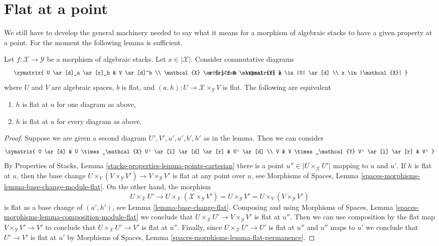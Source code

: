 \section{Flat at a point}
\label{section-flat-at-point}

\noindent
We still have to develop the general machinery needed to say what
it means for a morphism of algebraic stacks to have a given property
at a point. For the moment the following lemma is sufficient.

\begin{lemma}
\label{lemma-flat-at-point}
Let $f : \mathcal{X} \to \mathcal{Y}$ be a morphism of algebraic stacks.
Let $x \in |\mathcal{X}|$. Consider commutative diagrams
$$
\vcenter{
\xymatrix{
U \ar[d]_a \ar[r]_h & V \ar[d]^b \\
\mathcal{X} \ar[r]^f & \mathcal{Y}
}
}
\quad\text{with points}
\vcenter{
\xymatrix{
u \in |U| \ar[d] \\
x \in |\mathcal{X}|
}
}
$$
where $U$ and $V$ are algebraic spaces, $b$ is flat, and
$(a, h) : U \to \mathcal{X} \times_\mathcal{Y} V$
is flat. The following are equivalent
\begin{enumerate}
\item $h$ is flat at $u$ for one diagram as above,
\item $h$ is flat at $u$ for every diagram as above.
\end{enumerate}
\end{lemma}

\begin{proof}
Suppose we are given a second diagram $U', V', u', a', b', h'$ as
in the lemma. Then we can consider
$$
\xymatrix{
U \ar[d] & U \times_\mathcal{X} U' \ar[l] \ar[d] \ar[r] & U' \ar[d] \\
V & V \times_\mathcal{Y} V' \ar[l] \ar[r] & V'
}
$$
By Properties of Stacks, Lemma \ref{stacks-properties-lemma-points-cartesian}
there is a point $u'' \in |U \times_\mathcal{X} U'|$ mapping
to $u$ and $u'$. If $h$ is flat at $u$, then the base change
$U \times_V (V \times_\mathcal{Y} V') \to V \times_\mathcal{Y} V'$
is flat at any point over $u$, see
Morphisms of Spaces, Lemma \ref{spaces-morphisms-lemma-base-change-module-flat}.
On the other hand, the morphism
$$
U \times_\mathcal{X} U' \to
U \times_\mathcal{X} (\mathcal{X} \times_\mathcal{Y} V') =
U \times_\mathcal{Y} V' =
U \times_V (V \times_\mathcal{Y} V')
$$
is flat as a base change of $(a', h')$, see Lemma \ref{lemma-base-change-flat}.
Composing and using
Morphisms of Spaces, Lemma \ref{spaces-morphisms-lemma-composition-module-flat}
we conclude that $U \times_\mathcal{X} U' \to V \times_\mathcal{Y} V'$
is flat at $u''$. Then we can use composition by the flat map
$V \times_\mathcal{Y} V' \to V'$ to conclude that
$U \times_\mathcal{X} U' \to V'$ is flat at $u''$.
Finally, since $U \times_\mathcal{X} U' \to U'$ is flat
at $u''$ and $u''$ maps to $u'$ we conclude that
$U' \to V'$ is flat at $u'$ by
Morphisms of Spaces, Lemma \ref{spaces-morphisms-lemma-flat-permanence}.
\end{proof}

